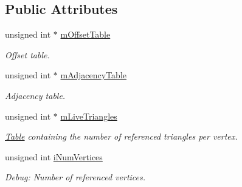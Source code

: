 \subsection*{Public Attributes}
\begin{DoxyCompactItemize}
\item 
\hypertarget{class_assimp_1_1_vertex_triangle_adjacency_a3fbbefa87fbbe4d55d4982e1cd32a9d0}{unsigned int $\ast$ \hyperlink{class_assimp_1_1_vertex_triangle_adjacency_a3fbbefa87fbbe4d55d4982e1cd32a9d0}{m\+Offset\+Table}}\label{class_assimp_1_1_vertex_triangle_adjacency_a3fbbefa87fbbe4d55d4982e1cd32a9d0}

\begin{DoxyCompactList}\small\item\em Offset table. \end{DoxyCompactList}\item 
\hypertarget{class_assimp_1_1_vertex_triangle_adjacency_a9cd119269d6c1f74dceb19fec8847f07}{unsigned int $\ast$ \hyperlink{class_assimp_1_1_vertex_triangle_adjacency_a9cd119269d6c1f74dceb19fec8847f07}{m\+Adjacency\+Table}}\label{class_assimp_1_1_vertex_triangle_adjacency_a9cd119269d6c1f74dceb19fec8847f07}

\begin{DoxyCompactList}\small\item\em Adjacency table. \end{DoxyCompactList}\item 
\hypertarget{class_assimp_1_1_vertex_triangle_adjacency_ac358d030371beb7e2e5bcb38860a0e15}{unsigned int $\ast$ \hyperlink{class_assimp_1_1_vertex_triangle_adjacency_ac358d030371beb7e2e5bcb38860a0e15}{m\+Live\+Triangles}}\label{class_assimp_1_1_vertex_triangle_adjacency_ac358d030371beb7e2e5bcb38860a0e15}

\begin{DoxyCompactList}\small\item\em \hyperlink{struct_table}{Table} containing the number of referenced triangles per vertex. \end{DoxyCompactList}\item 
\hypertarget{class_assimp_1_1_vertex_triangle_adjacency_aff248d29bb6a3804ae2ae90272c5625d}{unsigned int \hyperlink{class_assimp_1_1_vertex_triangle_adjacency_aff248d29bb6a3804ae2ae90272c5625d}{i\+Num\+Vertices}}\label{class_assimp_1_1_vertex_triangle_adjacency_aff248d29bb6a3804ae2ae90272c5625d}

\begin{DoxyCompactList}\small\item\em Debug\+: Number of referenced vertices. \end{DoxyCompactList}\end{DoxyCompactItemize}


